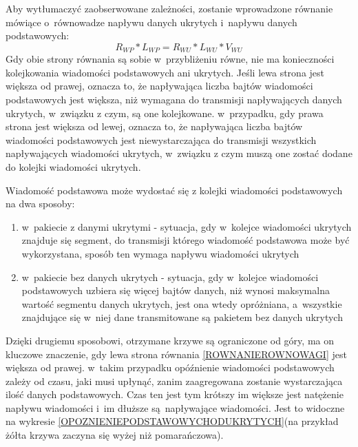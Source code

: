 \documentclass[a4paper, twoside, 12pt]{report}
\begin{document}
            Aby wytłumaczyć zaobserwowane zależności, zostanie wprowadzone równanie
            mówiące o~równowadze napływu danych ukrytych i~napływu danych podstawowych:
            \begin{equation} \label{ROWNANIEROWNOWAGI}
            R_{WP} * L_{WP} = R_{WU} * L_{WU} * V_{WU}
            \end{equation}
            Gdy obie strony równania są sobie w~przybliżeniu równe, nie ma konieczności
            kolejkowania wiadomości podstawowych ani ukrytych. Jeśli lewa strona jest
            większa od prawej, oznacza to, że napływająca liczba bajtów wiadomości podstawowych
            jest większa, niż wymagana do transmisji napływających danych ukrytych,
            w~związku z czym, są one kolejkowane. w~przypadku, gdy prawa strona jest
            większa od lewej, oznacza to, że napływająca liczba bajtów wiadomości
            podstawowych jest niewystarczająca do transmisji wszystkich napływających
            wiadomości ukrytych, w~związku z czym muszą one zostać dodane do kolejki
            wiadomości ukrytych.

            Wiadomość podstawowa może wydostać się z kolejki wiadomości podstawowych
            na dwa sposoby:
            \begin{enumerate}
                \item w~pakiecie z danymi ukrytymi - sytuacja, gdy w~kolejce
                    wiadomości ukrytych znajduje się segment, do transmisji którego
                    wiadomość podstawowa może być wykorzystana, sposób ten wymaga
                    napływu wiadomości ukrytych
                \item w~pakiecie bez danych ukrytych - sytuacja, gdy w~kolejce wiadomości
                    podstawowych uzbiera się więcej bajtów danych, niż wynosi
                    maksymalna wartość segmentu danych ukrytych, jest ona wtedy
                    opróżniana, a~wszystkie znajdujące się w~niej dane transmitowane
                    są pakietem bez danych ukrytych
            \end{enumerate}

            Dzięki drugiemu sposobowi, otrzymane krzywe są ograniczone od góry,
            ma on kluczowe znaczenie, gdy lewa strona równania \ref{ROWNANIEROWNOWAGI} jest większa od prawej.
            w~takim przypadku
            opóźnienie wiadomości podstawowych zależy od czasu, jaki musi upłynąć,
            zanim zaagregowana zostanie wystarczająca ilość danych podstawowych.
            Czas ten jest tym krótszy im większe jest natężenie napływu wiadomości
            i~im dłuższe są napływające wiadomości. Jest to widoczne na wykresie
            \ref{OPOZNIENIEPODSTAWOWYCHODUKRYTYCH}(na przykład żółta krzywa zaczyna
            się wyżej niż pomarańczowa).
\end{document}
